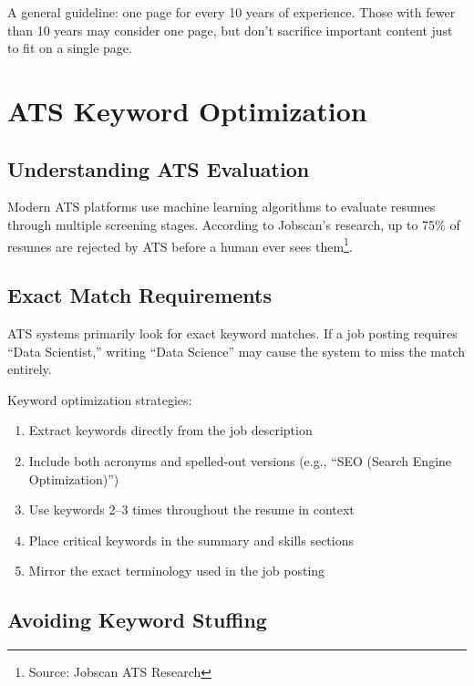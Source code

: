 \documentclass[11pt,a4paper]{article}
\begin{document}
\begin{bestpractice}
A general guideline: one page for every 10 years of experience. Those with fewer than 10 years may consider one page, but don't sacrifice important content just to fit on a single page.
\end{bestpractice}

\section{ATS Keyword Optimization}

\subsection{Understanding ATS Evaluation}

Modern ATS platforms use machine learning algorithms to evaluate resumes through multiple screening stages. According to Jobscan's research, up to 75\% of resumes are rejected by ATS before a human ever sees them\footnote{Source: Jobscan ATS Research}.

\subsection{Exact Match Requirements}

\begin{keystat}
ATS systems primarily look for exact keyword matches. If a job posting requires ``Data Scientist,'' writing ``Data Science'' may cause the system to miss the match entirely.
\end{keystat}

Keyword optimization strategies:
\begin{enumerate}
    \item Extract keywords directly from the job description
    \item Include both acronyms and spelled-out versions (e.g., ``SEO (Search Engine Optimization)'')
    \item Use keywords 2--3 times throughout the resume in context
    \item Place critical keywords in the summary and skills sections
    \item Mirror the exact terminology used in the job posting
\end{enumerate}

\subsection{Avoiding Keyword Stuffing}
\end{document}
